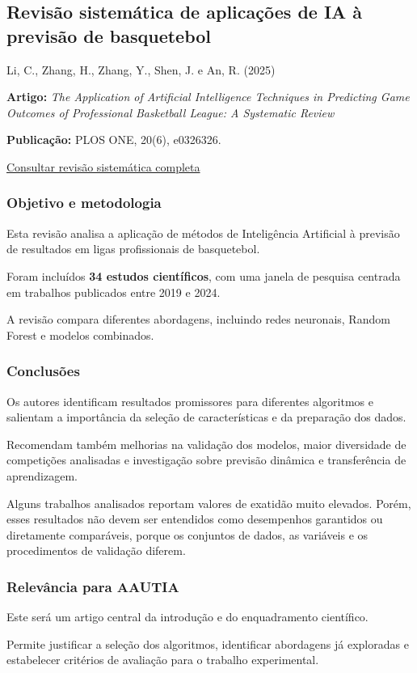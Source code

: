 \subsection{Revisão sistemática de aplicações de IA à previsão de basquetebol}\label{aautia:revisuxe3o-sistemuxe1tica-de-aplicauxe7uxf5es-de-ia-uxe0-previsuxe3o-de-basquetebol}

Li, C., Zhang, H., Zhang, Y., Shen, J. e An, R. (2025) \cite{li2025}

\textbf{Artigo:} \emph{The Application of Artificial Intelligence Techniques in Predicting Game Outcomes of Professional Basketball League: A Systematic Review}

\textbf{Publicação:} PLOS ONE, 20(6), e0326326.

\href{https://doi.org/10.1371/journal.pone.0326326}{Consultar revisão sistemática completa}

\subsubsection{Objetivo e metodologia}\label{aautia:objetivo-e-metodologia-4}

Esta revisão analisa a aplicação de métodos de Inteligência Artificial à previsão de resultados em ligas profissionais de basquetebol.

Foram incluídos \textbf{34 estudos científicos}, com uma janela de pesquisa centrada em trabalhos publicados entre 2019 e 2024.

A revisão compara diferentes abordagens, incluindo redes neuronais, Random Forest e modelos combinados.

\subsubsection{Conclusões}\label{aautia:conclusuxf5es}

Os autores identificam resultados promissores para diferentes algoritmos e salientam a importância da seleção de características e da preparação dos dados.

Recomendam também melhorias na validação dos modelos, maior diversidade de competições analisadas e investigação sobre previsão dinâmica e transferência de aprendizagem.

Alguns trabalhos analisados reportam valores de exatidão muito elevados. Porém, esses resultados não devem ser entendidos como desempenhos garantidos ou diretamente comparáveis, porque os conjuntos de dados, as variáveis e os procedimentos de validação diferem.

\subsubsection{Relevância para AAUTIA}\label{aautia:relevuxe2ncia-para-aautia-4}

Este será um artigo central da introdução e do enquadramento científico.

Permite justificar a seleção dos algoritmos, identificar abordagens já exploradas e estabelecer critérios de avaliação para o trabalho experimental.

